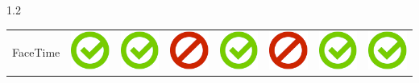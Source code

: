 \documentclass[final]{beamer}
\newlength{\twocolwid}
\begin{document}
\begin{frame}[t]
\begin{columns}[t, totalwidth=\textwidth]
\begin{column}{1.2\twocolwid}
\begin{tabular}{ L{8cm} | C{4.5cm} | C{4.5cm} | C{4.5cm} | C{4.5cm} | C{4.5cm} | C{5cm} | C{4.5cm} | }
FaceTime & \includegraphics[scale=0.5]{pics/haken.png} & \includegraphics[scale=0.5]{pics/haken.png} & \includegraphics[scale=0.5]{pics/nohaken.png} & \includegraphics[scale=0.5]{pics/haken.png} & \includegraphics[scale=0.5]{pics/nohaken.png} & \includegraphics[scale=0.5]{pics/haken.png} & \includegraphics[scale=0.5]{pics/haken.png} \tabularnewline

\end{tabular}
\end{column}
\end{columns}
\end{frame}
\end{document}
